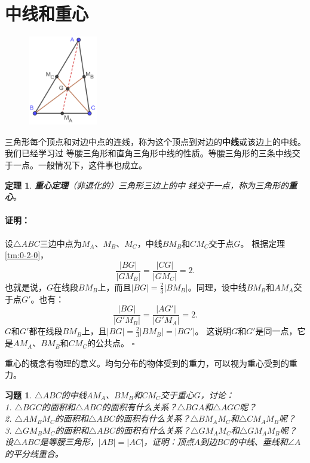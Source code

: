 \documentclass[12pt,UTF8]{ctexbook}
\newtheorem{tm}{定理}[section]
\newenvironment{proof2}{\paragraph{\textbf{证明：}}}{\hfill$\square$}
\newtheorem{xt}{习题}[section]
\begin{document}
\section{中线和重心}
\begin{figure} %
    \vspace{-60pt}
    \includegraphics[width=0.27\textwidth]{三角形重心证明.png}
\end{figure}
三角形每个顶点和对边中点的连线，称为这个顶点到对边的\textbf{中线}或该边上的中线。我们已经学习过
等腰三角形和直角三角形中线的性质。等腰三角形的三条中线交于一点。一般情况下，这件事也成立。

\begin{tm}{\textbf{重心定理}}\label{tm:1-3-0}
    （非退化的）三角形三边上的中
    线交于一点，称为三角形的\textbf{重心}。
\end{tm}
\begin{proof2}
    设$\triangle ABC$三边中点为$M_A$、$M_B$、$M_C$，中线$BM_B$和$CM_C$交于点$G$。
    根据定理\ref{tm:0-2-0}，
    $$\frac{|BG|}{|GM_B|} = \frac{|CG|}{|GM_C|} = 2.$$
    也就是说，$G$在线段$BM_B$上，而且$|BG| = \frac23 |BM_B|$。同理，设中线$BM_B$和$AM_A$交于点$G'$。也有：
    $$\frac{|BG|}{|G'M_B|} = \frac{|AG'|}{|G'M_A|} = 2.$$
    $G$和$G'$都在线段$BM_B$上，且$|BG| = \frac23 |BM_B| = |BG'|$。
    这说明$G$和$G'$是同一点，它是$AM_A$、$BM_B$和$CM_C$的公共点。
\end{proof2}

重心的概念有物理的意义。均匀分布的物体受到的重力，可以视为重心受到的重力。
\begin{xt}\label{xt:1-3-0}
    $\triangle ABC$的中线$AM_A$、$BM_B$和$CM_C$交于重心$G$，讨论：\\
    1. $\triangle BGC$的面积和$\triangle ABC$的面积有什么关系？$\triangle BGA$和$\triangle AGC$呢？\\
    2. $\triangle AM_BM_C$的面积和$\triangle ABC$的面积有什么关系？$\triangle BM_AM_C$和$\triangle CM_AM_B$呢？\\
    3. $\triangle GM_BM_C$的面积和$\triangle ABC$的面积有什么关系？$\triangle GM_AM_C$和$\triangle GM_AM_B$呢？\\
    设$\triangle ABC$是等腰三角形，$|AB| = |AC|$，证明：顶点$A$到边$BC$的中线、垂线和$\angle A$的平分线重合。\\
\end{xt}
\end{document}
